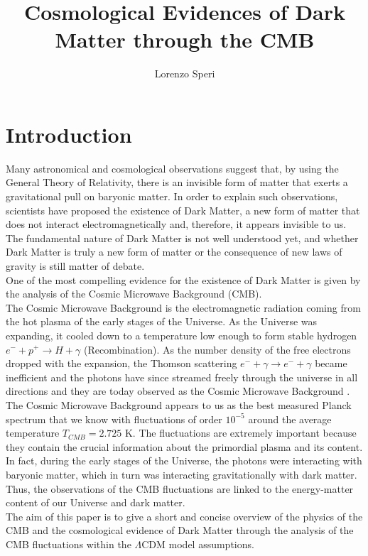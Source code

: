 \documentclass{article}
\title{Cosmological Evidences of Dark Matter through the CMB}
\author{Lorenzo Speri}
\date{}
\begin{document}
\maketitle

\vspace{3cm}
\section{Introduction}
Many astronomical and cosmological observations suggest that, by using the General Theory of Relativity, there is an invisible form of matter that exerts a gravitational pull on baryonic matter. 
In order to explain such observations, scientists have proposed the existence of Dark Matter, a new form of matter that does not interact electromagnetically and, therefore, it appears invisible to us. 
The fundamental nature of Dark Matter is not well understood yet, and whether Dark Matter is truly a new form of matter or the consequence of new laws of gravity is still matter of debate.\\
One of the most compelling evidence for the existence of Dark Matter is given by the analysis of the Cosmic Microwave Background (CMB).\\
The Cosmic Microwave Background is the electromagnetic radiation coming from the hot plasma of the early stages of the Universe.
As the Universe was expanding, it cooled down to a temperature low enough to form stable hydrogen $e^- + p^+  \rightarrow H + \gamma$ (Recombination). 
As the number density of the free electrons dropped with the expansion, the Thomson scattering $e^- + \gamma  \rightarrow e^- + \gamma$ became inefficient and the photons have since streamed freely through the universe in all directions and they are today observed as the Cosmic Microwave Background \citep{LecturesPdf}.\\
The Cosmic Microwave Background appears to us as the best measured Planck spectrum that we know with fluctuations of order $10 ^{-5}$ around the average temperature $T_{CMB} =2.725$ K.
The fluctuations are extremely important because they contain the crucial information about the primordial plasma and its content. 
In fact, during the early stages of the Universe, the photons were interacting with baryonic matter, which in turn was interacting gravitationally with dark matter.
Thus, the observations of the CMB fluctuations are linked to the energy-matter content of our Universe and dark matter.\\
The aim of this paper is to give a short and concise overview of the physics of the CMB and the cosmological evidence of Dark Matter through the analysis of the CMB fluctuations within the $\Lambda$CDM model assumptions.
\end{document}
